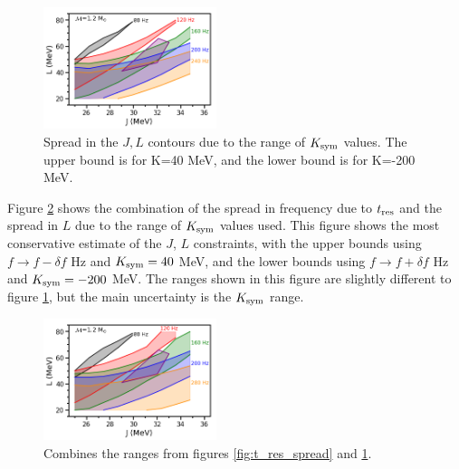 \documentclass[fleqn,usenatbib]{mnras}
\begin{document}
\begin{figure}
\centering
\includegraphics[width=0.45\textwidth,angle=0]{JL_spread_due_to_Ksym_grid.png}
\caption{Spread in the $J,L$ contours due to the range of $K_{\rm sym}$ values. The upper bound is for K=40 MeV, and the lower bound is for K=-200 MeV.}
\label{fig:constraints}
\end{figure}

\hspace{\parindent}Figure \ref{fig:all_constraints} shows the combination of the spread in frequency due to $t_{\rm res}$ and the spread in $L$ due to the range of $K_{\rm sym}$ values used. This figure shows the most conservative estimate of the $J$, $L$ constraints, with the upper bounds using $f\rightarrow f-\delta f$ Hz and $K_{\rm sym}=40$ MeV, and the lower bounds using $f\rightarrow f+\delta f$ Hz and $K_{\rm sym}=-200$ MeV. The ranges shown in this figure are slightly different to figure \ref{fig:constraints}, but the main uncertainty is the $K_{\rm sym}$ range.




\begin{figure}
\centering
\includegraphics[width=0.45\textwidth,angle=0]{JL_spread_due_to_Ksym_and_df_grid_280.png}
\caption{Combines the ranges from figures \ref{fig:t_res_spread} and \ref{fig:constraints}.}
\label{fig:all_constraints}
\end{figure}


\fi
\end{document}
